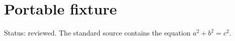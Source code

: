\documentclass{article}
\begin{document}
\section*{Portable fixture}
Status: reviewed.
The standard source contains the equation $a^2+b^2=c^2$.
\end{document}
